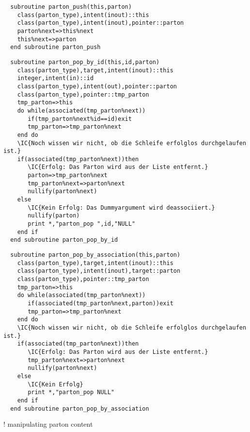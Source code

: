 \begin{Verbatim}
  subroutine parton_push(this,parton)
    class(parton_type),intent(inout)::this
    class(parton_type),intent(inout),pointer::parton
    parton%next=>this%next
    this%next=>parton
  end subroutine parton_push
\end{Verbatim}
\begin{Verbatim}
  subroutine parton_pop_by_id(this,id,parton)
    class(parton_type),target,intent(inout)::this
    integer,intent(in)::id
    class(parton_type),intent(out),pointer::parton
    class(parton_type),pointer::tmp_parton    
    tmp_parton=>this
    do while(associated(tmp_parton%next))
       if(tmp_parton%next%id==id)exit
       tmp_parton=>tmp_parton%next
    end do
    \IC{Noch wissen wir nicht, ob die Schleife erfolglos durchgelaufen ist.}
    if(associated(tmp_parton%next))then
       \IC{Erfolg: Das Parton wird aus der Liste entfernt.}
       parton=>tmp_parton%next
       tmp_parton%next=>parton%next
       nullify(parton%next)
    else
       \IC{Kein Erfolg: Das Dummyargument wird deassociiert.}
       nullify(parton)
       print *,"parton_pop ",id,"NULL"
    end if
  end subroutine parton_pop_by_id
\end{Verbatim}
\begin{Verbatim}
  subroutine parton_pop_by_association(this,parton)
    class(parton_type),target,intent(inout)::this
    class(parton_type),intent(inout),target::parton
    class(parton_type),pointer::tmp_parton    
    tmp_parton=>this
    do while(associated(tmp_parton%next))
       if(associated(tmp_parton%next,parton))exit
       tmp_parton=>tmp_parton%next
    end do
    \IC{Noch wissen wir nicht, ob die Schleife erfolglos durchgelaufen ist.}
    if(associated(tmp_parton%next))then
       \IC{Erfolg: Das Parton wird aus der Liste entfernt.}
       tmp_parton%next=>parton%next
       nullify(parton%next)
    else
       \IC{Kein Erfolg}
       print *,"parton_pop NULL"
    end if
  end subroutine parton_pop_by_association
\end{Verbatim}
! manipulating parton content 

